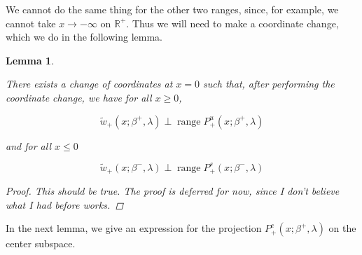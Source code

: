 \documentclass[12pt]{article}
\def\R{{\mathbb R}}
\DeclareMathOperator{\ran}{range}
\newtheorem{lemma}{Lemma}
\begin{document}
We cannot do the same thing for the other two ranges, since, for example, we cannot take $x \rightarrow -\infty$ on $\R^+$. Thus we will need to make a coordinate change, which we do in the following lemma.


\begin{lemma}\label{perpinner}

There exists a change of coordinates at $x = 0$ such that, after performing the coordinate change, we have for all $x \geq 0$,

\begin{equation}
\tilde{w}_+(x; \beta^+, \lambda) \perp \ran P^u_+(x; \beta^+, \lambda)
\end{equation}

and for all $x \leq 0$

\begin{equation}
\tilde{w}_+(x; \beta^-, \lambda) \perp \ran P^s_+(x; \beta^-, \lambda)
\end{equation}

\begin{proof}
This should be true. The proof is deferred for now, since I don't believe what I had before works.
\end{proof}
\end{lemma}


In the next lemma, we give an expression for the projection $P^c_+(x; \beta^+, \lambda)$ on the center subspace.
\end{document}
